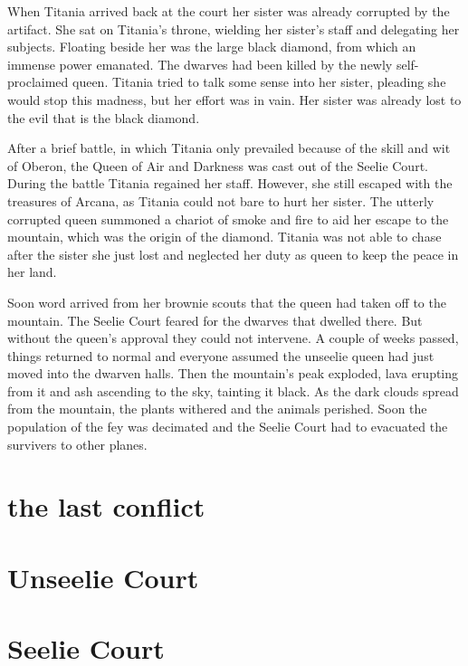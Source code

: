 \documentclass[letter,10pt,twocolumn,openany]{dndbook}
\begin{document}
When Titania arrived back at the court her sister was already corrupted by the artifact.
She sat on Titania's throne, wielding her sister's staff and delegating her subjects.
Floating beside her was the large black diamond, from which an immense power emanated.
The dwarves had been killed by the newly self-proclaimed queen.
Titania tried to talk some sense into her sister, pleading she would stop this madness, but her effort was in vain.
Her sister was already lost to the evil that is the black diamond.

After a brief battle, in which Titania only prevailed because of the skill and wit of Oberon, the Queen of Air and Darkness was cast out of the Seelie Court.
During the battle Titania regained her staff.
However, she still escaped with the treasures of Arcana, as Titania could not bare to hurt her sister.
The utterly corrupted queen summoned a chariot of smoke and fire to aid her escape to the mountain, which was the origin of the diamond.
Titania was not able to chase after the sister she just lost and neglected her duty as queen to keep the peace in her land.

Soon word arrived from her brownie scouts that the queen had taken off to the mountain.
The Seelie Court feared for the dwarves that dwelled there.
But without the queen's approval they could not intervene.
A couple of weeks passed, things returned to normal and everyone assumed the unseelie queen had just moved into the dwarven halls.
Then the mountain's peak exploded, lava erupting from it and ash ascending to the sky, tainting it black.
As the dark clouds spread from the mountain, the plants withered and the animals perished.
Soon the population of the fey was decimated and the Seelie Court had to evacuated the survivers to other planes.




\section{the last conflict}

\section{Unseelie Court}

\section{Seelie Court}
\end{document}
